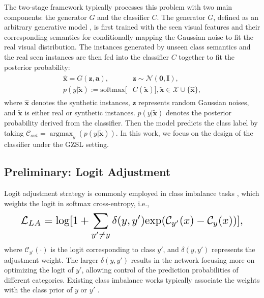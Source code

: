 \documentclass{article}
\DeclareMathOperator*{\argmax}{argmax}
\begin{document}
	The two-stage framework typically processes this problem with two main components: the generator $\mathit{G}$ and the classifier $\mathit{C}$. The generator $\mathit{G}$, defined as an arbitrary generative model \cite{kingma2013auto,goodfellow2014generative}, is first trained with the seen visual features and their corresponding semantics for conditionally mapping the Gaussian noise to fit the real visual distribution. The instances generated by unseen class semantics and the real seen instances are then fed into the classifier $\mathit{C}$ together to fit the posterior probability:
	\begin{equation}
	\begin{split}
    \begin{aligned}
	\mathbf{\hat{x}}=\mathit{G}(\mathbf{z},\mathbf{a}),&\mathbf{z}\sim\mathcal{N}(\mathbf{0},\mathbf{I}),\\ p(y|\mathbf{\widetilde{x}}):=\mathrm{softmax}[&\mathit{C}(\mathbf{\mathbf{\widetilde{x}}})], \mathbf{\widetilde{x}}\in \mathcal{X} \cup \{\mathbf{\hat{x}}\},
    \end{aligned}
	\end{split}
    \label{eq1}
	\end{equation}
	where $\mathbf{\hat{x}}$ denotes the synthetic instances, $\mathbf{z}$ represents random Gaussian noises, and $\mathbf{\widetilde{x}}$ is either real or synthetic instances. $p(y|\mathbf{\widetilde{x}})$ denotes the posterior probability derived from the classifier. Then the model predicts the class label by taking $\mathcal{C}_{out} = {\argmax}_y(p(y|\mathbf{\widetilde{x}}))$. In this work, we focus on the design of the classifier under the GZSL setting.
	
	\subsection{Preliminary: Logit Adjustment }
	
	Logit adjustment strategy is commonly employed in class imbalance tasks \cite{lin2017focal,menon2020long}, which weights the logit in softmax cross-entropy, i.e., 
	\begin{equation}
	\resizebox{.91\linewidth}{!}{$
		\displaystyle
		\mathcal{L}_{LA}=\mathrm{log}[1+\sum_{y' \ne y}\delta(y,y')  \mathrm {exp}(\mathcal{C}_{y'}(x)-\mathcal{C}_y(x))],
		$}
        \label{eq2}
	\end{equation}
	where $\mathcal{C}_{y'}(\cdot)$ is the logit corresponding to class $y'$, and $\delta(y,y')$ represents the adjustment weight. The larger $\delta(y,y')$ results in the network focusing more on optimizing the logit of $y'$, allowing control of the prediction probabilities of different categories. Existing class imbalance works typically associate the weights with the class prior of $y$ or $y'$ \cite{cao2019learning,tan2020equalization,menon2020long}.
	
\end{document}
